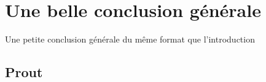 \section*{Une belle conclusion
générale}\label{une-belle-conclusion-guxe9nuxe9rale}

Une petite conclusion générale du même format que l'introduction

\subsection*{Prout}\label{prout}
